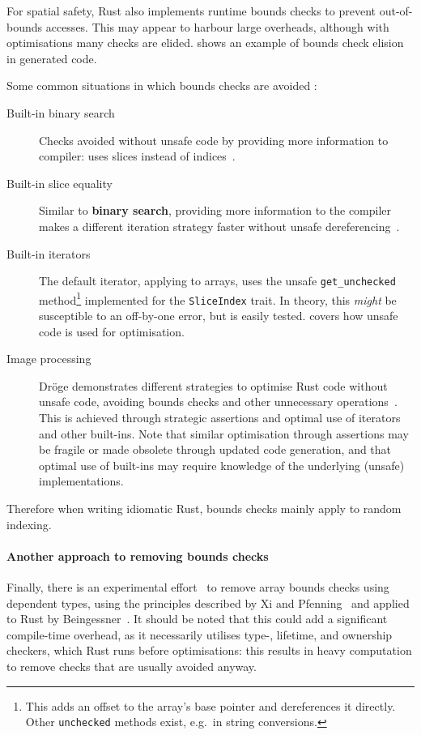 \documentclass[dissertation.tex]{subfiles}
\begin{document}
For spatial safety, Rust also implements runtime bounds checks to
prevent out-of-bounds accesses.
This may appear to harbour large overheads, although with optimisations
many checks are elided.
  shows an example of bounds
check elision in generated code.

Some common situations in which bounds checks are avoided :

\begin{description}
    \item[Built-in binary search] Checks avoided without unsafe code by
    providing more information to compiler: uses slices instead of
    indices~\cite{rust-pr-binarysearch}.
    \item[Built-in slice equality] Similar to \textbf{binary search},
    providing more information to the compiler makes a different
    iteration strategy faster without unsafe dereferencing~\cite{rust-pr-slice-partialeq}.
    \item[Built-in iterators] The default iterator, applying to arrays,
    uses the unsafe \texttt{get\_unchecked} method\footnote{This adds an
    offset to the array's base pointer and dereferences it directly.
    Other \texttt{unchecked} methods exist, e.g.\ in string
    conversions.} implemented for the \texttt{SliceIndex} trait.
    In theory, this \emph{might} be susceptible to an off-by-one error,
    but is easily tested.
     covers how unsafe code is used for optimisation.
    \item[Image processing] Dr\"oge demonstrates different strategies to
    optimise Rust code without unsafe code, avoiding bounds checks and
    other unnecessary operations~\cite{droge-opt}.
    This is achieved through strategic assertions and optimal use of
    iterators and other built-ins.
    Note that similar optimisation through assertions may be fragile or
    made obsolete through updated code generation, and that optimal use
    of built-ins may require knowledge of the underlying (unsafe)
    implementations.
\end{description}

Therefore when writing idiomatic Rust, bounds checks mainly apply to
random indexing.

\paragraph{Another approach to removing bounds checks}
Finally, there is an experimental effort~\cite{rust-crate-indexing} to
remove array bounds checks using dependent types, using the principles
described by Xi and Pfenning~\cite{xi-pfenning-dependent} and applied to
Rust by Beingessner~\cite{beingessner}.
It should be noted that this could add a significant compile-time
overhead, as it necessarily utilises type-, lifetime, and ownership
checkers, which Rust runs before optimisations: this results in
heavy computation to remove checks that are usually avoided anyway.
\end{document}
